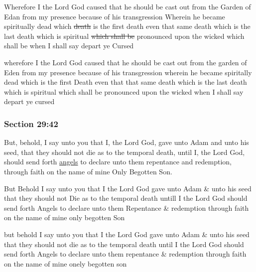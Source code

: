 		\begin{framed}
		\scriptsize
			\begin{compactdesc}
				\item[JSP] Wherefore I the Lord God caused that he should be cast out from the Garden of Edan from my presence because of his transgression Wherein he became spiritually dead which \sout{death} is the first death even that same death which is the last death which is spiritual \sout{which shall be} pronounced upon the wicked which shall be when I shall say depart ye Cursed
				\item[HSN] wherefore I the Lord God caused that he should be cast out from the garden of Eden from my presence because of his transgression wherein he became spiritally dead which is the first Death even that that same death which is the last death which is spiritual which shall be pronounced upon the wicked when I shall say depart ye cursed
			\end{compactdesc}
		\end{framed}

	\subsubsection{Section 29:42} %
		\label{DC29-42}

		But, behold, I say unto you that I, the Lord God, gave unto Adam and unto his seed, that they should not die as to the temporal death, until I, the Lord God, should send forth \hyperref[ANGEL]{angels} to declare unto them repentance and redemption, through faith on the name of mine Only Begotten Son.

		\begin{framed}
		\scriptsize
			\begin{compactdesc}
				\item[JSP] But Behold I say unto you that I the Lord God gave unto Adam \& unto his seed that they should not Die as to the temporal death untill I the Lord God should send forth Angels to declare unto them Repentance \& redemption through faith on the name of mine only begotten Son
				\item[HSN] but behold I say unto you that I the Lord God gave unto Adam \& unto his seed that they should not die as to the temporal death until I the Lord God should send forth Angels to declare unto them repentance \& redemption through faith on the name of mine onely begotten son
			\end{compactdesc}
		\end{framed}

